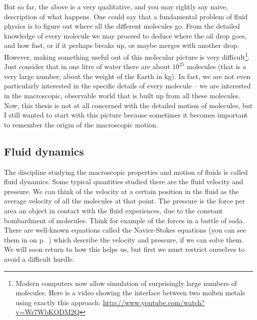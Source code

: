 \documentclass[thesis.tex]{subfiles}
\begin{document}
But so far, the above is a very qualitative, and you may rightly say naive, description of what happens. One could say that a fundamental problem of fluid physics is to figure out where all the different molecules go. From the detailed knowledge of every molecule we may proceed to deduce where the oil drop goes, and how fast, or if it perhaps breaks up, or maybe merges with another drop. However, making something useful out of this molecular picture is very difficult\footnote{
Modern computers now allow simulation of surprisingly large numbers of molecules. Here is a video showing the interface between two molten metals using exactly this approach: \url{http://www.youtube.com/watch?v=Wr7WbKODM2Q}
}.
Just consider that in one litre of water there are about $10^{25}$ molecules (that is a very large number; about the weight of the Earth in kg). In fact, we are not even particularly interested in the specific details of every molecule -- we are interested in the macroscopic, observable world that is built up from all these molecules. Now, this thesis is not at all concerned with the detailed motion of molecules, but I still wanted to start with this picture because sometimes it becomes important to remember the origin of the macroscopic motion.


\subsection*{Fluid dynamics}

The discipline studying the macroscopic properties and motion of fluids is called fluid dynamics. Some typical quantities studied there are the fluid velocity and pressure. We can think of the velocity at a certain position in the fluid as the average velocity of all the molecules at that point. The pressure is the force per area an object in contact with the fluid experiences, due to the constant bombardment of molecules. Think for example of the forces in a bottle of soda. There are well-known equations called the Navier-Stokes equations (you can see them in  on p.~\pageref{eqn:navierstokes}) which describe the velocity and pressure, if we can solve them. We will soon return to how this helps us, but first we must restrict ourselves to avoid a difficult hurdle.
\end{document}
